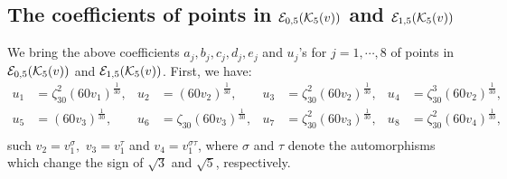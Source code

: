 \documentclass[11pt]{amsart}
\begin{document}
\subsection{The coefficients of  points in ${\mathcal E}_{0, 5}({\mathcal K}_5(v))$ and  ${\mathcal E}_{1, 5}({\mathcal K}_5(v))$}
\label{a0-5}

We bring the above coefficients $a_j, b_j, c_j, d_j, e_j$  and  $u_j$'s for $j=1,\cdots, 8$  of  points in ${\mathcal E}_{0, 5}({\mathcal K}_5(v))$ and  ${\mathcal E}_{1, 5}({\mathcal K}_5(v))$.
First, we have:
\begin{equation}
	\label{u-0-8}
	\begin{aligned}
		u_1 & =  \zeta_{30}^2(60 v_1)^\frac{1}{30}, &  u_2 & = (60 v_2)^\frac{1}{30}, &
		u_3 & =  \zeta_{30}^2(60 v_2)^\frac{1}{30}, & u_4 & =  \zeta_{30}^3(60 v_2)^\frac{1}{30}, \\
		u_5 & =  (60 v_3)^\frac{1}{30},  & u_6 & =  \zeta_{30}(60 v_3)^\frac{1}{30}, & 
		u_7 &=  \zeta_{30}^2(60 v_3)^\frac{1}{30},  &  u_8 &=  \zeta_{30}^2(60 v_4)^\frac{1}{30},\\
	\end{aligned}
\end{equation}
such $v_2=v_1^\sigma,$ $v_3=v_1^\tau$ and $v_4=v_1^{\sigma \tau}$, where  $\sigma$ and $\tau$ denote the  automorphisms which change the sign of  $\sqrt{3}$ and  $\sqrt{5}$, respectively.
\end{document}
